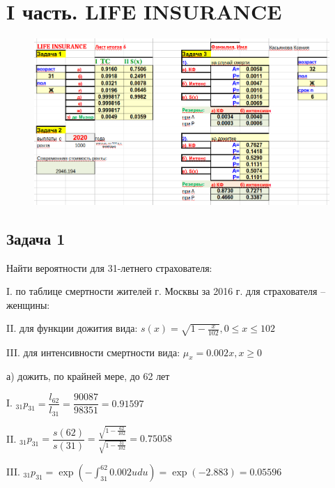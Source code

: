 \documentclass[12pt,a4paper, oneside]{extreport}
\begin{document}



\section*{I часть. LIFE INSURANCE}


\begin{figure}
	\centering
	\includegraphics[width=1\linewidth]{screenshot005}
	\label{fig:screenshot005}
\end{figure}




\subsection*{Задача 1}

Найти вероятности  для 31-летнего страхователя:

I. по таблице смертности жителей г. Москвы за 2016 г. для  
страхователя – женщины:

II. для функции дожития вида:  $s(x) = \sqrt{1-\frac{x}{102}},  
0 \leq x \leq 102 $

III.  для интенсивности  смертности вида: $\mu_x = 0.002x, x\geq 0$



а) дожить, по крайней мере, до 62 лет

I. $_{31}p_{31} = \dfrac{l_{62}}{l_{31}} = \dfrac{90087}{98351} = 0.91597$  

II. $_{31}p_{31} = \dfrac{s(62)}{s(31)} = \frac{\sqrt{1-\frac{62}{102}}}{\sqrt{1-\frac{31}{102}}} = 0.75058$  


III. $_{31}p_{31} =  \exp(-\int_{31}^{62} 0.002u  du  )  = \exp(-2.883)  = 0.05596$  
 
\end{document}
